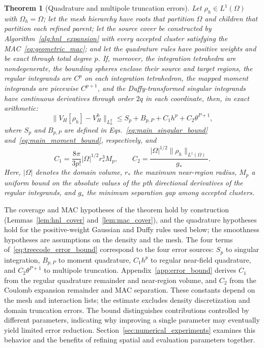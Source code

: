 \documentclass[a4paper,pdflatex,sn-mathphys-num]{sn-jnl}
\theoremstyle{thmstyleone}
\newtheorem{theorem}{Theorem}
\begin{document}
\begin{theorem}[Quadrature and multipole truncation errors]
\label{thm:treecode_error}
Let \(\rho_h\in L^1(\Omega)\) with \(\Omega_h=\Omega\); let the mesh hierarchy
have roots that partition \(\Omega\) and children that partition each refined
parent; let the source cover be constructed by
Algorithm~\ref{alg:hnl_expansion} with every accepted cluster satisfying the
MAC~\eqref{eq:geometric_mac}; and let the quadrature rules have positive
weights and be exact through total degree \(p\). If, moreover, the integration
tetrahedra are nondegenerate, the bounding spheres enclose their source and
target regions, the regular integrands are \(C^p\) on each integration
tetrahedron, the mapped moment integrands are piecewise \(C^{p+1}\), and the
Duffy-transformed singular integrands have continuous derivatives through order
\(2q\) in each coordinate, then, in exact arithmetic:
\begin{equation}
\|V_H[\rho_h]-V_H^h\|_{L_h^2}
\le
S_p+B_{p,P}+C_1h^p+C_2\theta^{P+1},
\label{eq:treecode_error_bound}
\end{equation}
where \(S_p\) and \(B_{p,P}\) are defined in Eqs.~\eqref{eq:main_singular_bound} and~\eqref{eq:main_moment_bound}, respectively, and
\begin{equation}
C_1=\frac{8\pi}{3p!}|\Omega|^{1/2}r_*^3M_p,
\qquad
C_2=\frac{|\Omega|^{1/2}\|\rho_h\|_{L^1(\Omega)}}{g_*}.
\label{eq:error_constants}
\end{equation}
Here, \(|\Omega|\) denotes the domain volume, \(r_*\) the maximum near-region radius, \(M_p\) a uniform bound on the absolute values of the \(p\)th directional derivatives of the regular integrands, and \(g_*\) the minimum separation gap among accepted clusters.
\end{theorem}

The coverage and MAC hypotheses of the theorem hold by construction
(Lemmas~\ref{lem:hnl_cover} and~\ref{lem:mac_cover}), and the quadrature
hypotheses hold for the positive-weight Gaussian and Duffy rules used below;
the smoothness hypotheses are assumptions on the density and the mesh. The four
terms of~\eqref{eq:treecode_error_bound} correspond to the four error sources:
\(S_p\) to singular integration, \(B_{p,P}\) to moment quadrature, \(C_1h^p\)
to regular near-field quadrature, and \(C_2\theta^{P+1}\) to multipole
truncation. Appendix~\ref{app:error_bound} derives \(C_1\) from the regular
quadrature remainder and near-region volume, and \(C_2\) from the Coulomb
expansion remainder and MAC separation. These constants depend on the mesh and
interaction lists; the estimate excludes density discretization and domain
truncation errors. The bound distinguishes contributions controlled by
different parameters, indicating why improving a single parameter may
eventually yield limited error reduction. Section~\ref{sec:numerical_experiments}
examines this behavior and the benefits of refining spatial and evaluation
parameters together.
\end{document}

